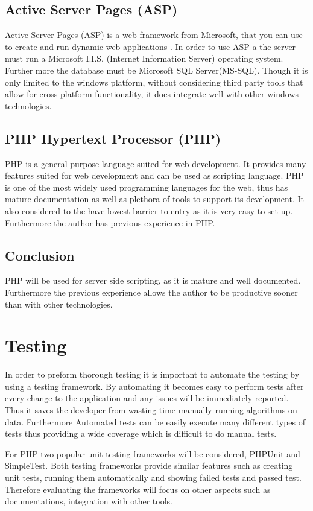 \documentclass[a4paper,oneside,11pt]{report}
\begin{document}
\subsection{Active Server Pages (ASP)} 
 Active Server Pages (ASP) is a web framework from Microsoft, that you can use to create and run dynamic web applications \autocite{microsoftasp}. In order to use ASP a the server must run a Microsoft I.I.S. (Internet Information Server) operating system. Further more the database must be Microsoft SQL Server(MS-SQL). Though it is only limited to the windows platform, without considering third party tools that allow for cross platform functionality, it does integrate well with other windows technologies.
 
\subsection{PHP Hypertext Processor (PHP) } 
PHP is a general purpose language suited for web development. It provides many features suited for web development and can be used as scripting language. PHP is one of the most widely used programming languages for the web, thus has mature documentation as well as plethora of tools to support its development. It also considered to the have lowest barrier to entry as it is very easy to set up. Furthermore the author has previous experience in PHP.

\subsection{Conclusion}
PHP will be used for server side scripting, as it is mature and well documented. Furthermore the previous experience allows the author to be productive sooner than with other technologies.
\section{Testing}
In order to preform thorough testing it is important to automate the testing by using a testing framework. By automating it becomes easy to perform tests after every change to the application and any issues will be immediately reported. Thus it saves the developer from wasting time manually running algorithms on data. Furthermore Automated tests can be easily execute many different types of tests thus providing a wide coverage which is difficult to do manual tests.

For PHP two popular unit testing frameworks will be considered, PHPUnit and SimpleTest. Both testing frameworks provide similar features such as creating unit tests, running them automatically and showing failed tests and passed test. Therefore evaluating the frameworks will focus on other aspects such as documentations, integration with other tools.
\end{document}
